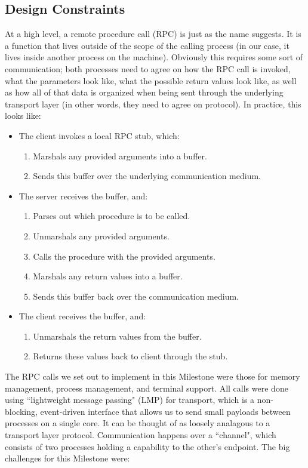 \subsection{Design Constraints}
At a high level, a remote procedure call (RPC) is just as the name suggests. It is a function that lives outside of the scope of the calling process (in our case, it lives inside another process on the machine). Obviously this requires some sort of communication; both processes need to agree on how the RPC call is invoked, what the parameters look like, what the possible return values look like, as well as how all of that data is organized when being sent through the underlying transport layer (in other words, they need to agree on protocol). In practice, this looks like:
\begin{itemize}[itemsep=0pt]
    \item The client invokes a local RPC stub, which: \begin{enumerate}[itemsep=0pt]
        \item Marshals any provided arguments into a buffer.
        \item Sends this buffer over the underlying communication medium.
    \end{enumerate}
    \item The server receives the buffer, and: \begin{enumerate}[itemsep=0pt]
        \item Parses out which procedure is to be called.
        \item Unmarshals any provided arguments.
        \item Calls the procedure with the provided arguments.
        \item Marshals any return values into a buffer.
        \item Sends this buffer back over the communication medium.
    \end{enumerate}
    \item The client receives the buffer, and: \begin{enumerate}[itemsep=0pt]
        \item Unmarshals the return values from the buffer.
        \item Returns these values back to client through the stub.
    \end{enumerate}
\end{itemize}
The RPC calls we set out to implement in this Milestone were those for memory management, process management, and terminal support. All calls were done using ``lightweight message passing" (LMP) for transport, which is a non-blocking, event-driven interface that allows us to send small payloads between processes on a single core. It can be thought of as loosely analagous to a transport layer protocol. Communication happens over a ``channel", which consists of two processes holding a capability to the other's endpoint. The big challenges for this Milestone were:
